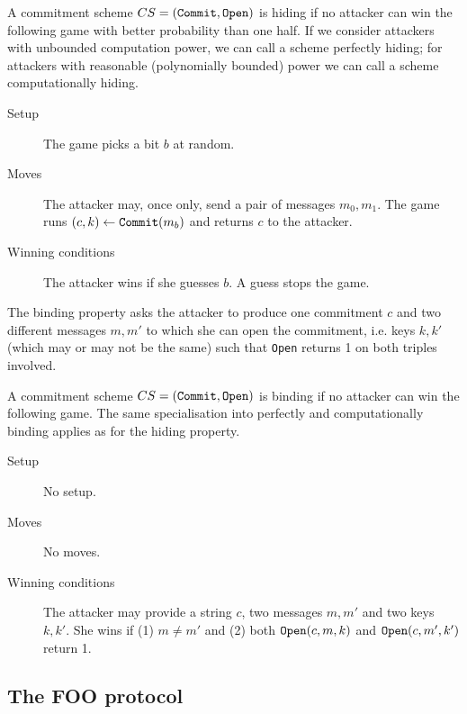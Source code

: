 \documentclass{llncs}
\newcommand{\alg}[1]{\textup{\texttt{#1}}}
\begin{document}
\begin{definition}
A commitment scheme $CS = (\alg{Commit}, \alg{Open})$ is hiding if no attacker
can win the following game with better probability than one half. If we consider
attackers with unbounded computation power, we can call a scheme perfectly
hiding; for attackers with reasonable (polynomially bounded) power we can call a
scheme computationally hiding.

\begin{description}
\item[Setup]
The game picks a bit $b$ at random.

\item[Moves]
The attacker may, once only, send a pair of messages $m_0, m_1$. The game runs
$(c, k) \gets \alg{Commit}(m_b)$ and returns $c$ to the attacker.

\item[Winning conditions]
The attacker wins if she guesses $b$. A guess stops the game.
\end{description}
\end{definition}

The binding property asks the attacker to produce one commitment $c$ and two
different messages $m, m'$ to which she can open the commitment, i.e. keys
$k, k'$ (which may or may not be the same) such that \alg{Open} returns 1 on
both triples involved.

\begin{definition}
A commitment scheme $CS = (\alg{Commit}, \alg{Open})$ is binding if no attacker
can win the following game. The same specialisation into perfectly and
computationally binding applies as for the hiding property.

\begin{description}
\item[Setup]
No setup.

\item[Moves]
No moves.

\item[Winning conditions]
The attacker may provide a string $c$, two messages $m, m'$ and two keys
$k, k'$. She wins if (1) $m \neq m'$ and (2) both $\alg{Open}(c, m, k)$ and
$\alg{Open}(c, m', k')$ return 1.
\end{description}
\end{definition}

\subsection{The FOO protocol}
\end{document}
